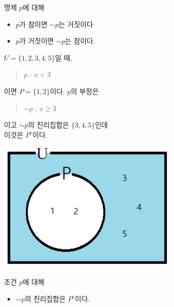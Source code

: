 \documentclass{oblivoir}
\begin{document}
\begin{mdframed}
%
\theo{}\label{negation2}
명제 \(p\)에 대해
\begin{itemize}
\item
\(p\)가 참이면 \(\sim p\)는 거짓이다
\item
\(p\)가 거짓이면 \(\sim p\)는 참이다.
\end{itemize}
\end{mdframed}

%
\label{negation3}
\par\noindent
\begin{minipage}{0.5\textwidth}
\(U=\{1,2,3,4,5\}\)일 때,
\begin{quote}
\(p\) : \(x<3\)
\end{quote}
이면 \(P=\{1,2\}\)이다.
\(p\)의 부정은
\begin{quote}
\(\sim p\) : \(x\ge3\)
\end{quote}
이고 \(\sim p\)의 진리집합은 \(\{3,4,5\}\)인데\\
이것은 \(P^c\)이다.
\end{minipage}
\begin{minipage}{0.45\textwidth}
\begin{center}
\includegraphics[width=0.66\textwidth]{negation_3}
\end{center}
\end{minipage}

\begin{mdframed}
%
\theo{}\label{negation_4}
조건 \(p\)에 대해
\begin{itemize}
\item
\(\sim p\)의 진리집합은 \(P^c\)이다.
\end{itemize}
\end{mdframed}

%
\end{document}
